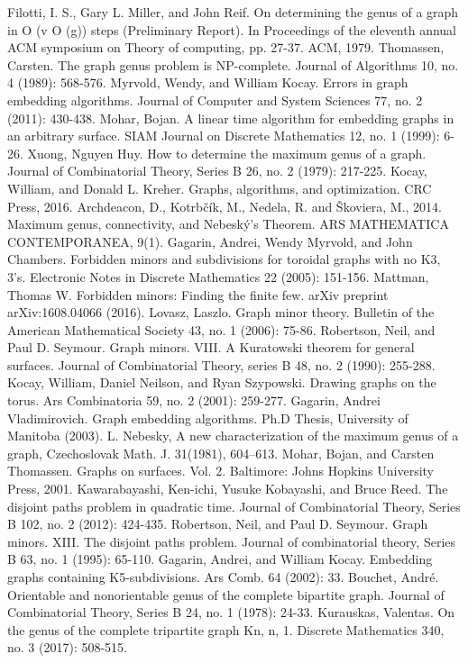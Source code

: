 \documentclass[12pt,conference]{IEEEtran}
\begin{document}
\begin{thebibliography}{1}
 Filotti, I. S., Gary L. Miller, and John Reif. On determining the genus of a graph in O (v O (g)) steps (Preliminary Report). In Proceedings of the eleventh annual ACM symposium on Theory of computing, pp. 27-37. ACM, 1979.
 Thomassen, Carsten. The graph genus problem is NP-complete. Journal of Algorithms 10, no. 4 (1989): 568-576.
 Myrvold, Wendy, and William Kocay. Errors in graph embedding algorithms. Journal of Computer and System Sciences 77, no. 2 (2011): 430-438.
 Mohar, Bojan. A linear time algorithm for embedding graphs in an arbitrary surface. SIAM Journal on Discrete Mathematics 12, no. 1 (1999): 6-26.
 Xuong, Nguyen Huy. How to determine the maximum genus of a graph. Journal of Combinatorial Theory, Series B 26, no. 2 (1979): 217-225.
 Kocay, William, and Donald L. Kreher. Graphs, algorithms, and optimization. CRC Press, 2016.
 Archdeacon, D., Kotrbčík, M., Nedela, R. and Škoviera, M., 2014. Maximum genus, connectivity, and Nebeský's Theorem. ARS MATHEMATICA CONTEMPORANEA, 9(1).
 Gagarin, Andrei, Wendy Myrvold, and John Chambers. Forbidden minors and subdivisions for toroidal graphs with no K3, 3's. Electronic Notes in Discrete Mathematics 22 (2005): 151-156.
 Mattman, Thomas W. Forbidden minors: Finding the finite few. arXiv preprint arXiv:1608.04066 (2016).
 Lovasz, Laszlo. Graph minor theory. Bulletin of the American Mathematical Society 43, no. 1 (2006): 75-86.
 Robertson, Neil, and Paul D. Seymour. Graph minors. VIII. A Kuratowski theorem for general surfaces. Journal of Combinatorial Theory, series B 48, no. 2 (1990): 255-288.
 Kocay, William, Daniel Neilson, and Ryan Szypowski. Drawing graphs on the torus. Ars Combinatoria 59, no. 2 (2001): 259-277.
 Gagarin, Andrei Vladimirovich. Graph embedding algorithms. Ph.D Thesis, University of Manitoba (2003).
 L. Nebesky, A new characterization of the maximum genus of a graph, Czechoslovak Math. J. 31(1981), 604–613.
 Mohar, Bojan, and Carsten Thomassen. Graphs on surfaces. Vol. 2. Baltimore: Johns Hopkins University Press, 2001.
 Kawarabayashi, Ken-ichi, Yusuke Kobayashi, and Bruce Reed. The disjoint paths problem in quadratic time. Journal of Combinatorial Theory, Series B 102, no. 2 (2012): 424-435.
 Robertson, Neil, and Paul D. Seymour. Graph minors. XIII. The disjoint paths problem. Journal of combinatorial theory, Series B 63, no. 1 (1995): 65-110.
 Gagarin, Andrei, and William Kocay. Embedding graphs containing K5-subdivisions. Ars Comb. 64 (2002): 33.
 Bouchet, André. Orientable and nonorientable genus of the complete bipartite graph. Journal of Combinatorial Theory, Series B 24, no. 1 (1978): 24-33.
 Kurauskas, Valentas. On the genus of the complete tripartite graph Kn, n, 1. Discrete Mathematics 340, no. 3 (2017): 508-515.
\end{thebibliography}
\end{document}
